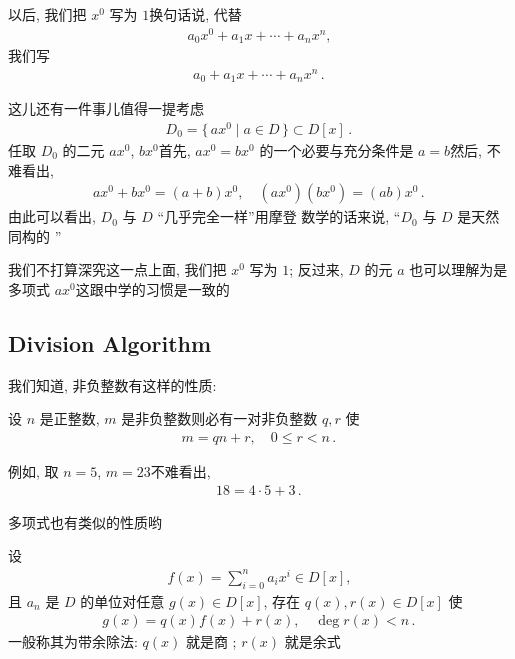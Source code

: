 \begin{remark}
    以后, 我们把 $x^0$ 写为 $1$\period 换句话说, 代替
    \begin{align*}
        a_0 x^0 + a_1 x + \cdots + a_n x^n,
    \end{align*}
    我们写
    \begin{align*}
        a_0 + a_1 x + \cdots + a_n x^n \period
    \end{align*}

    这儿还有一件事儿值得一提\period 考虑
    \begin{align*}
        D_0 = \{\, ax^0 \mid a \in D \,\} \subset D[x] \period
    \end{align*}
    任取 $D_0$ 的二元 $ax^0$, $bx^0$\period 首先, $ax^0 = bx^0$ 的一个必要与充分条件是 $a=b$\period 然后, 不难看出,
    \begin{align*}
        ax^0 + bx^0 = (a+b)x^0, \quad (ax^0)(bx^0) = (ab)x^0 \period
    \end{align*}
    由此可以看出, $D_0$ 与 $D$ ``几乎完全一样''\period 用摩登  数学的话来说, ``$D_0$ 与 $D$ 是天然同构的 ''\period

    我们不打算深究这一点\period 上面, 我们把 $x^0$ 写为 $1$; 反过来, $D$ 的元 $a$ 也可以理解为是多项式 $ax^0$\period 这跟中学的习惯是一致的\period
\end{remark}

\subsection*{Division Algorithm}

我们知道, 非负整数有这样的性质:

\begin{proposition}
    设 $n$ 是正整数, $m$ 是非负整数\period 则必有一对非负整数 $q,r$ 使
    \begin{align*}
        m = qn + r, \quad 0 \leq r < n \period
    \end{align*}
\end{proposition}

例如, 取 $n=5$, $m=23$\period 不难看出,
\begin{align*}
    18 = 4 \cdot 5 + 3 \period
\end{align*}

多项式也有类似的性质哟\period

\begin{proposition}
    设
    \begin{align*}
        f(x) = \sum_{i = 0}^{n} a_i x^i \in D[x],
    \end{align*}
    且 $a_n$ 是 $D$ 的单位\period 对任意 $g(x) \in D[x]$, 存在 $q(x), r(x) \in D[x]$ 使
    \begin{align*}
        g(x) = q(x) f(x) + r(x), \quad \deg r(x) < n \period
    \end{align*}
    一般称其为带余除法: $q(x)$ 就是商 ; $r(x)$ 就是余式 \period
\end{proposition}


